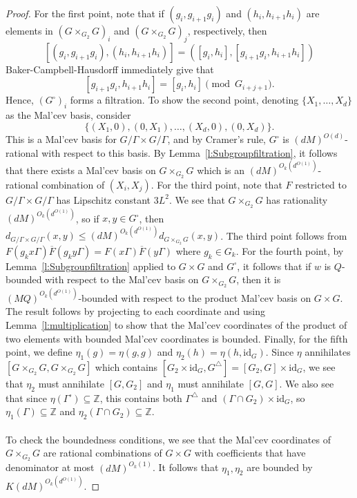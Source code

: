 \documentclass[11pt, a4paper]{amsart}
\theoremstyle{plain}
\theoremstyle{plain}
\theoremstyle{definition}
\theoremstyle{remark}
\numberwithin{equation}{section}
\numberwithin{lemma}{section}
\numberwithin{proposition}{section}
\numberwithin{corollary}{section}
\numberwithin{definition}{section}
\numberwithin{claim}{section}
\begin{document}
\begin{proof}
    For the first point, note that if $(g_i, g_{i + 1}g_i)$ and $(h_i, h_{i + 1}h_i)$ are elements in $(G \times_{G_2} G)_i$ and $(G \times_{G_2} G)_j$, respectively, then 
    $$[(g_i, g_{i + 1}g_i), (h_i, h_{i + 1}h_i)] = ([g_i, h_i], [g_{i + 1}g_i, h_{i + 1}h_i])$$
    Baker-Campbell-Hausdorff immediately give that
    $$[g_{i + 1}g_i, h_{i + 1}h_i] = [g_i, h_i] \pmod{G_{i + j + 1}}.$$
    Hence, $(G^\square)_i$ forms a filtration. To show the second point, denoting $\{X_1, \dots, X_d\}$ as the Mal'cev basis, consider
    $$\{(X_1, 0), (0, X_1), \dots, (X_d, 0), (0, X_d)\}.$$
    This is a Mal'cev basis for $G/\Gamma \times G/\Gamma$, and by Cramer's rule, $G^\square$ is $(dM)^{O(d)}$-rational with respect to this basis. By Lemma~\ref{l:Subgroupfiltration}, it follows that there exists a Mal'cev basis on $G \times_{G_2} G$ which is an $(dM)^{O_k(d^{O(1)})}$-rational combination of $(X_i, X_j)$. For the third point, note that $F$ restricted to $G/\Gamma \times G/\Gamma$ has Lipschitz constant $3L^2$. We see that $G \times_{G_2} G$ has rationality $(dM)^{O_k(d^{O(1)})}$, so if $x, y \in G^\square$, then $d_{G/\Gamma \times G/\Gamma}(x, y) \le (dM)^{O_k(d^{O(1)})}d_{G \times_{G_2} G} (x, y)$. The third point follows from $F(g_kx\Gamma)\overline{F}(g_{k}y\Gamma) = F(x\Gamma)\overline{F}(y\Gamma)$ where $g_k \in G_{k}$. For the fourth point, by Lemma~\ref{l:Subgroupfiltration} applied to $G \times G$ and $G^\square$, it follows that if $w$ is $Q$-bounded with respect to the Mal'cev basis on $G \times_{G_2} G$, then it is $(MQ)^{O_k(d^{O(1)})}$-bounded with respect to the product Mal'cev basis on $G \times G$. The result follows by projecting to each coordinate and using Lemma~\ref{l:multiplication} to show that the Mal'cev coordinates of the product of two elements with bounded Mal'cev coordinates is bounded. Finally, for the fifth point, we define $\eta_1(g) = \eta(g, g)$ and $\eta_2(h) = \eta(h, \mathrm{id}_G)$. Since $\eta$ annihilates $[G \times_{G_2} G, G \times_{G_2} G]$ which contains $[G_2 \times \mathrm{id}_G, G^\triangle] = [G_2, G] \times \mathrm{id}_G$, we see that $\eta_2$ must annihilate $[G, G_2]$ and $\eta_1$ must annihilate $[G, G]$. We also see that since $\eta(\Gamma^\square) \subseteq \mathbb{Z}$, this contains both $\Gamma^\triangle$ and $(\Gamma \cap G_2) \times \mathrm{id}_G$, so $\eta_1(\Gamma) \subseteq \mathbb{Z}$ and $\eta_2(\Gamma \cap G_2) \subseteq \mathbb{Z}$. \\\\
    To check the boundedness conditions, we see that the Mal'cev coordinates of $G \times_{G_2} G$ are rational combinations of $G \times G$ with coefficients that have denominator at most $(dM)^{O_k(1)}$. It follows that $\eta_1, \eta_2$ are bounded by $K(dM)^{O_k(d^{O(1)})}$.
\end{proof}
\end{document}
